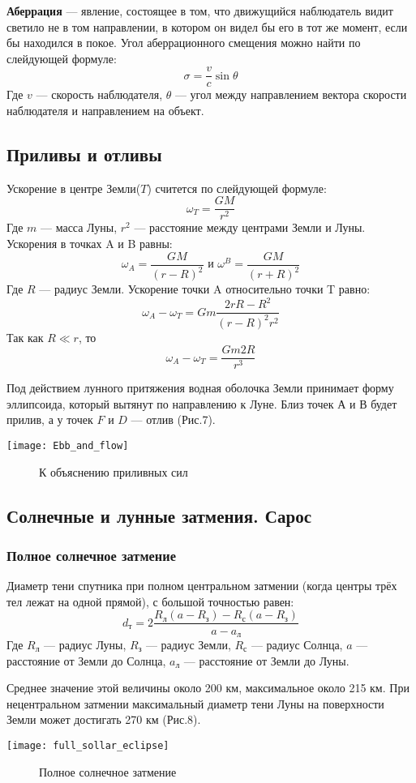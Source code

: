 \documentclass[10pt,a5paper]{article}
\begin{document}
\textbf{Аберрация} --- явление, состоящее в том, что движущийся наблюдатель видит светило не в том направлении, в котором он видел бы его в тот же момент, если бы находился в покое. 
Угол аберрационного смещения можно найти по слейдующей формуле:
$$\sigma=\frac{v}{c}\sin\theta$$
Где $v$ --- скорость наблюдателя, $\theta$ --- угол между направлением вектора скорости наблюдателя и направлением на объект.
\subsection*{Приливы и отливы}
Ускорение в центре Земли($T$) считется по слейдующей формуле: $$\omega_T=\frac{GM}{r^2}$$
Где $m$ --- масса Луны, $r^2$ --- расстояние между центрами Земли и Луны. Ускорения в точках A и B равны:
$$\omega_A=\frac{GM}{(r-R)^2} \text{ и } \omega^B=\frac{GM}{(r+R)^2}$$
Где $R$ --- радиус Земли. Ускорение точки A относительно точки T равно:
$$\omega_A-\omega_T=Gm\frac{2rR-R^2}{(r-R)^2r^2}$$
Так как $R\ll r$, то $$\omega_A-\omega_T=\frac{Gm2R}{r^3}$$

Под действием лунного притяжения водная оболочка Земли принимает форму эллипсоида, который вытянут по направлению к Луне. Близ точек $А$ и $В$ будет прилив, а у точек $F$ и $D$ --- отлив (Рис.7).
\begin{center}
\texttt{[image: Ebb\_and\_flow]}
\begin{figure}[h!]
\caption{К объяснению приливных сил}
\end{figure}
\end{center}
\subsection*{Солнечные и лунные затмения. Сарос}
\subsubsection*{Полное солнечное затмение}
Диаметр тени спутника при полном центральном затмении (когда центры трёх тел лежат на одной прямой), с большой точностью равен:
$$d_\text{т}=2\frac{R_\text{л}(a-R_\text{з})-R_\text{с}(a-R_\text{з})}{a-a_\text{л}}$$
Где $R_\text{л}$ --- радиус Луны, $R_\text{з}$ --- радиус Земли, $R_\text{с}$ --- радиус Солнца, $a$ --- расстояние от Земли до Солнца, $a_\text{л}$ --- расстояние от Земли до Луны.

Среднее значение  этой величины около 200 км, максимальное около 215 км. При нецентральном затмении максимальный диаметр тени Луны на поверхности Земли может достигать 270 км (Рис.8).
\begin{center}
\texttt{[image: full\_sollar\_eclipse]}
\begin{figure}[h!]
\caption{Полное солнечное затмение}
\end{figure}
\end{center}
\end{document}
